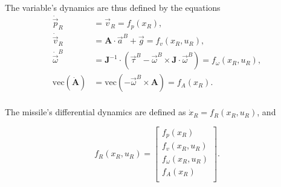 The variable's dynamics are thus defined by the equations
\begin{align*}
    \dot{\vec{p}}_{R} &= \vec{v}_{R} = f_p(x_R), \\
    \dot{\vec{v}}_{R} &= \mathbf{A} \cdot \vec{a}^B + \vec{g}  = f_v(x_R, u_R), \\
    \dot{\vec{\omega}}^B &= \mathbf{J}^{-1} \cdot (\vec{\tau}^B - \vec{\omega}^B \times \mathbf{J} \cdot \vec{\omega}^B) = f_{\omega}(x_R, u_R), \\
    \text{vec}(\dot{\mathbf{A}}) &= \text{vec}(-\vec{\omega}^B \times \mathbf{A}) = f_A(x_R). \\
\end{align*}

The missile's differential dynamics are defined as $\dot{x}_{R} = f_R(x_R, u_R)$, and 

\begin{equation*}
    f_R(x_R, u_R) = \begin{bmatrix}
        f_p(x_R) \\
        f_v(x_R, u_R) \\
        f_{\omega}(x_R, u_R) \\
        f_A(x_R) \\
    \end{bmatrix}.
\end{equation*}

